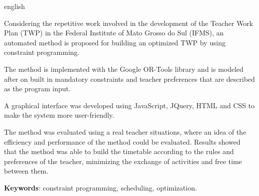 \begin{resumo}[Abstract]

\begin{otherlanguage*}{english}

Considering the repetitive work involved in the development of the Teacher Work Plan (TWP) in the Federal Institute of Mato Grosso do Sul (IFMS), an automated method is proposed for building an optimized TWP by using constraint programming.

The method is implemented with the Google OR-Tools library and is modeled after on built in mandatory constraints and teacher preferences that are described as the program input.

A graphical interface was developed using JavaScript, JQuery, HTML and CSS to make the system more user-friendly.

The method was evaluated using a real teacher situations, where an idea of the efficiency and performance of the method could be evaluated. Results showed that the method was able to build the timetable according to the rules and preferences of the teacher, minimizing the exchange of activities and free time between them.

		\vspace{\onelineskip}
		
		\noindent 
		\textbf{Keywords}: constraint programming, scheduling, optimization.
	\end{otherlanguage*}
\end{resumo}